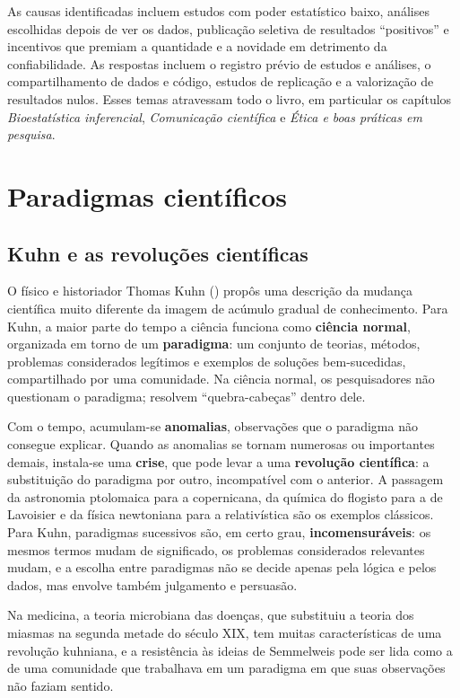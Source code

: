 \documentclass[
]{book}
\begin{document}
As causas identificadas incluem estudos com poder estatístico baixo, análises escolhidas depois de ver os dados, publicação seletiva de resultados ``positivos'' e incentivos que premiam a quantidade e a novidade em detrimento da confiabilidade. As respostas incluem o registro prévio de estudos e análises, o compartilhamento de dados e código, estudos de replicação e a valorização de resultados nulos. Esses temas atravessam todo o livro, em particular os capítulos \emph{Bioestatística inferencial}, \emph{Comunicação científica} e \emph{Ética e boas práticas em pesquisa}.

\section{Paradigmas científicos}\label{paradigmas-cientuxedficos}

\subsection{Kuhn e as revoluções científicas}\label{kuhn-e-as-revoluuxe7uxf5es-cientuxedficas}

O físico e historiador Thomas Kuhn () propôs uma descrição da mudança científica muito diferente da imagem de acúmulo gradual de conhecimento. Para Kuhn, a maior parte do tempo a ciência funciona como \textbf{ciência normal}, organizada em torno de um \textbf{paradigma}: um conjunto de teorias, métodos, problemas considerados legítimos e exemplos de soluções bem-sucedidas, compartilhado por uma comunidade. Na ciência normal, os pesquisadores não questionam o paradigma; resolvem ``quebra-cabeças'' dentro dele.

Com o tempo, acumulam-se \textbf{anomalias}, observações que o paradigma não consegue explicar. Quando as anomalias se tornam numerosas ou importantes demais, instala-se uma \textbf{crise}, que pode levar a uma \textbf{revolução científica}: a substituição do paradigma por outro, incompatível com o anterior. A passagem da astronomia ptolomaica para a copernicana, da química do flogisto para a de Lavoisier e da física newtoniana para a relativística são os exemplos clássicos. Para Kuhn, paradigmas sucessivos são, em certo grau, \textbf{incomensuráveis}: os mesmos termos mudam de significado, os problemas considerados relevantes mudam, e a escolha entre paradigmas não se decide apenas pela lógica e pelos dados, mas envolve também julgamento e persuasão.

Na medicina, a teoria microbiana das doenças, que substituiu a teoria dos miasmas na segunda metade do século XIX, tem muitas características de uma revolução kuhniana, e a resistência às ideias de Semmelweis pode ser lida como a de uma comunidade que trabalhava em um paradigma em que suas observações não faziam sentido.
\end{document}
